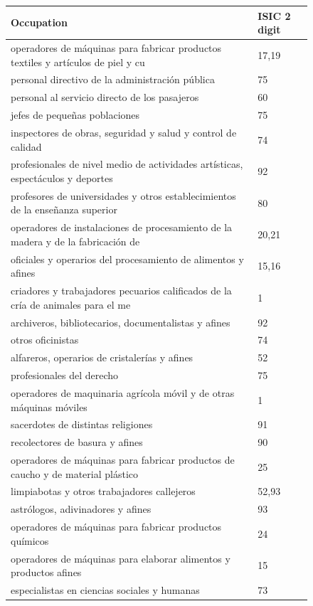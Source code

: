 \documentclass[12pt]{article}
\begin{document}
\begin{figure}[H]
\begin{center}
\scriptsize
\begin{tabular}{ll}
Occupation & ISIC 2 digit\\ \hline
operadores de m\'{a}quinas para fabricar productos textiles y art\'{i}culos de piel y cu & 17,19\\
personal directivo de la administraci\'{o}n p\'{u}blica & 75\\
personal al servicio directo de los pasajeros & 60\\
jefes de peque\~{n}as poblaciones & 75\\
inspectores de obras, seguridad y salud y control de calidad & 74 \\
profesionales de nivel medio de actividades art\'{i}sticas, espect\'{a}culos y deportes & 92\\
profesores de universidades y otros establecimientos de la ense\~{n}anza superior & 80 \\
operadores de instalaciones de procesamiento de la madera y de la fabricaci\'{o}n de & 20,21\\
oficiales y operarios del procesamiento de alimentos y afines & 15,16\\
criadores y trabajadores pecuarios calificados de la cr\'{i}a de animales para el me & 1\\
archiveros, bibliotecarios, documentalistas y afines & 92\\
otros oficinistas & 74\\
alfareros, operarios de cristaler\'{i}as y afines & 52\\
profesionales del derecho & 75\\
operadores de maquinaria agr\'{i}cola m\'{o}vil y de otras m\'{a}quinas m\'{o}viles & 1\\
sacerdotes de distintas religiones & 91\\
recolectores de basura y afines & 90\\
operadores de m\'{a}quinas para fabricar productos de caucho y de material pl\'{a}stico & 25\\
limpiabotas y otros trabajadores callejeros & 52,93\\
astr\'{o}logos, adivinadores y afines & 93\\
operadores de m\'{a}quinas para fabricar productos qu\'{i}micos & 24\\
operadores de m\'{a}quinas para elaborar alimentos y productos afines & 15\\
especialistas en ciencias sociales y humanas & 73\\

\end{tabular}
\end{center}
\end{figure}
\end{document}
